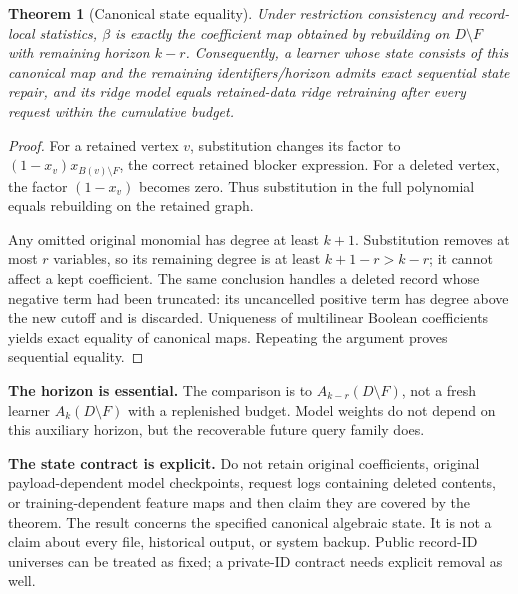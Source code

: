 \documentclass[11pt,a4paper]{article}
\newtheorem{theorem}{Theorem}[section]
\theoremstyle{definition}\newtheorem{definition}[theorem]{Definition}
\newcommand{\minus}{\setminus}
\begin{document}
\begin{theorem}[Canonical state equality]\label{thm:state}
Under restriction consistency and record-local statistics, $\beta$ is exactly the coefficient map obtained by rebuilding on $D\minus F$ with remaining horizon $k-r$. Consequently, a learner whose state consists of this canonical map and the remaining identifiers/horizon admits exact sequential state repair, and its ridge model equals retained-data ridge retraining after every request within the cumulative budget.
\end{theorem}
\begin{proof}
For a retained vertex $v$, substitution changes its factor to
$(1-x_v)x_{B(v)\minus F}$, the correct retained blocker expression. For a deleted vertex, the factor $(1-x_v)$ becomes zero. Thus substitution in the full polynomial equals rebuilding on the retained graph.

Any omitted original monomial has degree at least $k+1$. Substitution removes at most $r$ variables, so its remaining degree is at least $k+1-r>k-r$; it cannot affect a kept coefficient. The same conclusion handles a deleted record whose negative term had been truncated: its uncancelled positive term has degree above the new cutoff and is discarded. Uniqueness of multilinear Boolean coefficients yields exact equality of canonical maps. Repeating the argument proves sequential equality.
\end{proof}

\textbf{The horizon is essential.} The comparison is to $A_{k-r}(D\minus F)$, not a fresh learner $A_k(D\minus F)$ with a replenished budget. Model weights do not depend on this auxiliary horizon, but the recoverable future query family does.

\textbf{The state contract is explicit.} Do not retain original coefficients, original payload-dependent model checkpoints, request logs containing deleted contents, or training-dependent feature maps and then claim they are covered by the theorem. The result concerns the specified canonical algebraic state. It is not a claim about every file, historical output, or system backup. Public record-ID universes can be treated as fixed; a private-ID contract needs explicit removal as well.
\end{document}
